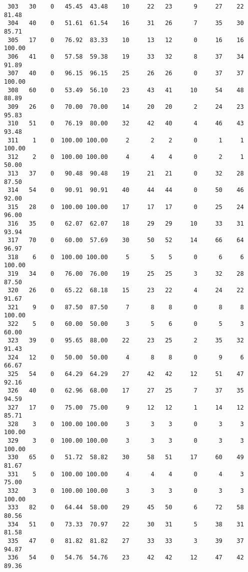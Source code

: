 \begin{verbatim}
 303   30    0   45.45  43.48    10     22   23      9     27    22    81.48
 304   40    0   51.61  61.54    16     31   26      7     35    30    85.71
 305   17    0   76.92  83.33    10     13   12      0     16    16   100.00
 306   41    0   57.58  59.38    19     33   32      8     37    34    91.89
 307   40    0   96.15  96.15    25     26   26      0     37    37   100.00
 308   60    0   53.49  56.10    23     43   41     10     54    48    88.89
 309   26    0   70.00  70.00    14     20   20      2     24    23    95.83
 310   51    0   76.19  80.00    32     42   40      4     46    43    93.48
 311    1    0  100.00 100.00     2      2    2      0      1     1   100.00
 312    2    0  100.00 100.00     4      4    4      0      2     1    50.00
 313   37    0   90.48  90.48    19     21   21      0     32    28    87.50
 314   54    0   90.91  90.91    40     44   44      0     50    46    92.00
 315   28    0  100.00 100.00    17     17   17      0     25    24    96.00
 316   35    0   62.07  62.07    18     29   29     10     33    31    93.94
 317   70    0   60.00  57.69    30     50   52     14     66    64    96.97
 318    6    0  100.00 100.00     5      5    5      0      6     6   100.00
 319   34    0   76.00  76.00    19     25   25      3     32    28    87.50
 320   26    0   65.22  68.18    15     23   22      4     24    22    91.67
 321    9    0   87.50  87.50     7      8    8      0      8     8   100.00
 322    5    0   60.00  50.00     3      5    6      0      5     3    60.00
 323   39    0   95.65  88.00    22     23   25      2     35    32    91.43
 324   12    0   50.00  50.00     4      8    8      0      9     6    66.67
 325   54    0   64.29  64.29    27     42   42     12     51    47    92.16
 326   40    0   62.96  68.00    17     27   25      7     37    35    94.59
 327   17    0   75.00  75.00     9     12   12      1     14    12    85.71
 328    3    0  100.00 100.00     3      3    3      0      3     3   100.00
 329    3    0  100.00 100.00     3      3    3      0      3     3   100.00
 330   65    0   51.72  58.82    30     58   51     17     60    49    81.67
 331    5    0  100.00 100.00     4      4    4      0      4     3    75.00
 332    3    0  100.00 100.00     3      3    3      0      3     3   100.00
 333   82    0   64.44  58.00    29     45   50      6     72    58    80.56
 334   51    0   73.33  70.97    22     30   31      5     38    31    81.58
 335   47    0   81.82  81.82    27     33   33      3     39    37    94.87
 336   54    0   54.76  54.76    23     42   42     12     47    42    89.36

\end{verbatim}

